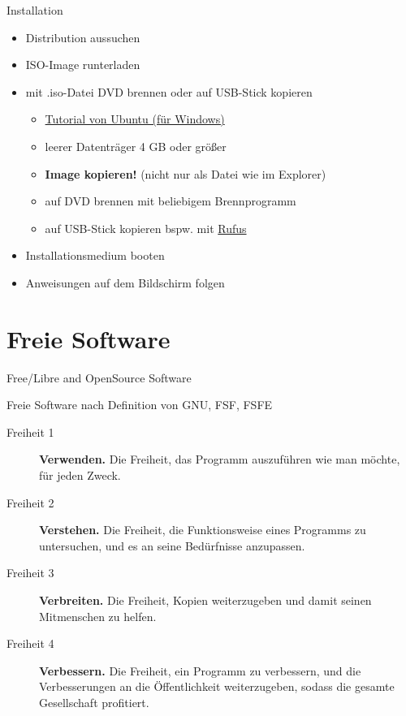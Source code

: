 \documentclass{beamer}
\makeatletter
\newcommand{\strong}[1]{\@strong{#1}}
\newcommand{\@@strong}[1]{\textbf{\let\@strong\@@@strong#1}}
\newcommand{\@@@strong}[1]{\textnormal{\let\@strong\@@strong#1}}
\let\@strong\@@strong
\makeatother
\begin{document}
\begin{frame}{Installation}
    \begin{itemize}
        \item Distribution aussuchen
        \item ISO-Image runterladen
        \item mit .iso-Datei DVD brennen oder auf USB-Stick kopieren
            \begin{itemize}
                \item \href{https://tutorials.ubuntu.com/tutorial/tutorial-create-a-usb-stick-on-windows}{Tutorial von Ubuntu (für Windows)}
                \item leerer Datenträger 4 GB oder größer
                \item \strong{Image kopieren!} (nicht nur als Datei wie im Explorer)
                \item auf DVD brennen mit beliebigem Brennprogramm
                \item auf USB-Stick kopieren bspw. mit \href{https://rufus.ie/}{Rufus}
            \end{itemize}
        \item Installationsmedium booten
        \item Anweisungen auf dem Bildschirm folgen
    \end{itemize}
\end{frame}

\section{Freie Software}

\frame{\tableofcontents[currentsection]}

\begin{frame}{Free/Libre and OpenSource Software}
    \begin{block}{Freie Software nach Definition von GNU, FSF, FSFE}
        \begin{description}
            \item[Freiheit 1] \strong{Verwenden.} {\small Die Freiheit,
                das Programm auszuführen wie man möchte, für jeden
                Zweck.}
            \item[Freiheit 2] \strong{Verstehen.} {\small Die Freiheit,
                die Funktionsweise eines Programms zu untersuchen, und
                es an seine Bedürfnisse anzupassen.}
            \item[Freiheit 3] \strong{Verbreiten.} {\small Die Freiheit,
                Kopien weiterzugeben und damit seinen Mitmenschen zu
                helfen.}
            \item[Freiheit 4] \strong{Verbessern.} {\small Die Freiheit,
                ein Programm zu verbessern, und die Verbesserungen
                an die Öffentlichkeit weiterzugeben, sodass die
                gesamte Gesellschaft profitiert.}
        \end{description}
    \end{block}
\end{frame}
\end{document}
